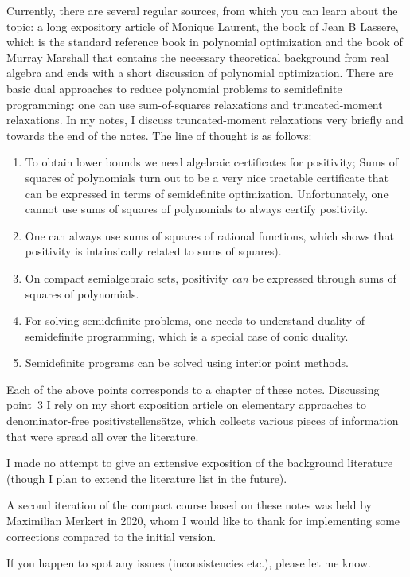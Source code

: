 Currently, there are several regular sources, from which you can learn about the topic: a long expository article of Monique Laurent, the book of Jean B Lassere, which is the standard reference book in polynomial optimization and the book of Murray Marshall that contains the necessary theoretical background from real algebra and ends with a short discussion of polynomial optimization.  There are basic dual approaches to reduce polynomial problems to semidefinite programming: one can use sum-of-squares relaxations and truncated-moment relaxations. In my notes, I discuss truncated-moment relaxations very briefly and towards the end of the notes. The line of thought is as follows: 
\begin{enumerate}
	\item To obtain lower bounds we need algebraic certificates for positivity; Sums of squares of polynomials turn out to be a very nice tractable certificate that can be expressed in terms of semidefinite optimization. Unfortunately, one cannot use sums of squares of polynomials to always certify positivity.
	\item One can always use sums of squares of rational functions, which shows that positivity is intrinsically related to sums of squares).
	\item On compact semialgebraic sets, positivity \emph{can} be expressed through sums of squares of polynomials. 
	\item For solving semidefinite problems, one needs to understand duality of semidefinite programming, which is a special case of conic duality. 
	\item Semidefinite programs can be solved using interior point methods. 
\end{enumerate}

Each of the above points corresponds to a chapter of these notes. Discussing point~3 I rely on my short exposition article \cite{averkov2013constructive} on elementary approaches to denominator-free positivstellensätze, which collects various pieces of information that were spread all over the literature. 

I made no attempt to give an extensive exposition of the background literature (though I plan to extend the literature list in the future).

A second iteration of the compact course based on these notes was held by Maximilian Merkert in 2020, whom I would like to thank for implementing some corrections compared to the initial version.

If you happen to spot any issues (inconsistencies etc.), please let me know. 

